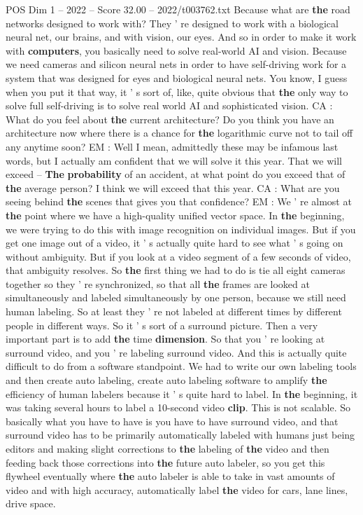 \begin{textsample}{POS Dim 1 – 2022 – Score 32.00 – 2022/t003762.txt}
Because what are \textbf{the} road networks designed to work with?
They ' re designed to work with a biological neural net, our brains, and with vision, our eyes.
And so in order to make it work with \textbf{computers}, you basically need to solve real-world AI and vision.
Because we need cameras and silicon neural nets in order to have self-driving work for a system that was designed for eyes and biological neural nets.
You know, I guess when you put it that way, it ' s sort of, like, quite obvious that \textbf{the} only way to solve full self-driving is to solve real world AI and sophisticated vision.
CA : What do you feel about \textbf{the} current architecture?
Do you think you have an architecture now where there is a chance for \textbf{the} logarithmic curve not to tail off any anytime soon?
EM : Well I mean, admittedly these may be infamous last words, but I actually am confident that we will solve it this year.
That we will exceed -- \textbf{The} \textbf{probability} of an accident, at what point do you exceed that of \textbf{the} average person?
I think we will exceed that this year.
CA : What are you seeing behind \textbf{the} scenes that gives you that confidence?
EM : We ' re almost at \textbf{the} point where we have a high-quality unified vector space.
In \textbf{the} beginning, we were trying to do this with image recognition on individual images.
But if you get one image out of a video, it ' s actually quite hard to see what ' s going on without ambiguity.
But if you look at a video segment of a few seconds of video, that ambiguity resolves.
So \textbf{the} first thing we had to do is tie all eight cameras together so they ' re synchronized, so that all \textbf{the} frames are looked at simultaneously and labeled simultaneously by one person, because we still need human labeling.
So at least they ' re not labeled at different times by different people in different ways.
So it ' s sort of a surround picture.
Then a very important part is to add \textbf{the} time \textbf{dimension}.
So that you ' re looking at surround video, and you ' re labeling surround video.
And this is actually quite difficult to do from a software standpoint.
We had to write our own labeling tools and then create auto labeling, create auto labeling software to amplify \textbf{the} efficiency of human labelers because it ' s quite hard to label.
In \textbf{the} beginning, it was taking several hours to label a 10-second video \textbf{clip}.
This is not scalable.
So basically what you have to have is you have to have surround video, and that surround video has to be primarily automatically labeled with humans just being editors and making slight corrections to \textbf{the} labeling of \textbf{the} video and then feeding back those corrections into \textbf{the} future auto labeler, so you get this flywheel eventually where \textbf{the} auto labeler is able to take in vast amounts of video and with high accuracy, automatically label \textbf{the} video for cars, lane lines, drive space.

\end{textsample}

